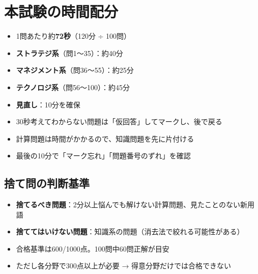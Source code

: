 \section{本試験の時間配分}

\begin{teigi}[120分100問の時間配分]
\begin{itemize}
  \item 1問あたり約\textbf{72秒}（120分 ÷ 100問）
  \item \textbf{ストラテジ系}（問1〜35）：約40分
  \item \textbf{マネジメント系}（問36〜55）：約25分
  \item \textbf{テクノロジ系}（問56〜100）：約45分
  \item \textbf{見直し}：10分を確保
\end{itemize}
\end{teigi}

\begin{advice}[時間配分のコツ]
\begin{itemize}
  \item 30秒考えてわからない問題は「仮回答」してマークし、後で戻る
  \item 計算問題は時間がかかるので、知識問題を先に片付ける
  \item 最後の10分で「マーク忘れ」「問題番号のずれ」を確認
\end{itemize}
\end{advice}

\subsection{捨て問の判断基準}

\begin{teigi}[捨て問の判断]
\begin{itemize}
  \item \textbf{捨てるべき問題}：2分以上悩んでも解けない計算問題、見たことのない新用語
  \item \textbf{捨ててはいけない問題}：知識系の問題（消去法で絞れる可能性がある）
  \item 合格基準は600/1000点。100問中60問正解が目安
  \item ただし各分野で300点以上が必要 → 得意分野だけでは合格できない
\end{itemize}
\end{teigi}

